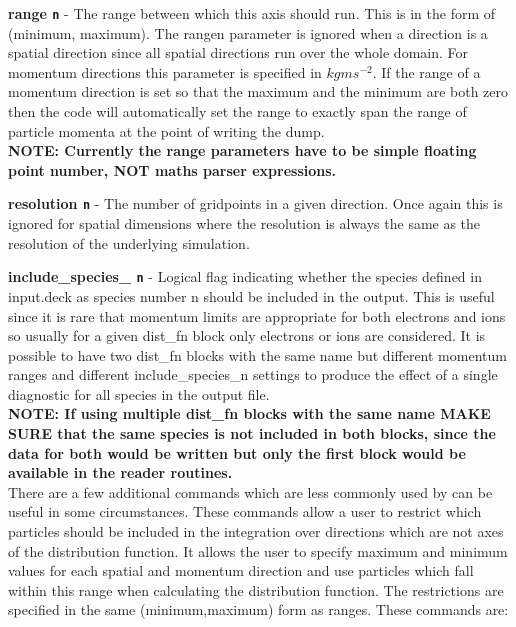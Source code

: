 \documentclass[12pt,a4paper]{article}
\newcommand{\emphtext}{\color{warwickdark} \fontfamily{phv}\selectfont\Large\bf}
\newcommand{\inlinecode}[1]{{\color{warwickred} \bf\texttt{#1}}}
\begin{document}
{\emphtext range\inlinecode{n}} - The range between which this axis should
run. This is in the form of (minimum, maximum). The rangen parameter is ignored
when a direction is a spatial direction since all spatial directions run over
the whole domain. For momentum directions this parameter is specified in
$kgms^{-2}$. If the range of a momentum direction is set so that the maximum
and the minimum are both zero then the code will automatically set the range to
exactly span the range of particle momenta at the point of writing the dump.\\

{\emphtext NOTE: Currently the range parameters have to be simple floating
point number, NOT maths parser expressions.}

{\emphtext resolution\inlinecode{n}} - The number of gridpoints in a given
direction. Once again this is ignored for spatial dimensions where the
resolution is always the same as the resolution of the underlying simulation.

{\emphtext include\_species\_\inlinecode{n}} - Logical flag indicating whether
the species defined in input.deck as species number n should be included in the
output. This is useful since it is rare that momentum limits are appropriate
for both electrons and ions so usually for a given dist\_fn block only
electrons or ions are considered. It is possible to have two dist\_fn blocks
with the same name but different momentum ranges and different
include\_species\_n settings to produce the effect of a single diagnostic for
all species in the output file.\\

{\emphtext NOTE: If using multiple dist\_fn blocks with the same name MAKE SURE
that the same species is not included in both blocks, since the data for both
would be written but only the first block would be available in the reader
routines.}\\

There are a few additional commands which are less commonly used by can be
useful in some circumstances. These commands allow a user to restrict which
particles should be included in the integration over directions which are not
axes of the distribution function. It allows the user to specify maximum and
minimum values for each spatial and momentum direction and use particles which
fall within this range when calculating the distribution function. The
restrictions are specified in the same (minimum,maximum) form as ranges. These
commands are:\\
\end{document}
